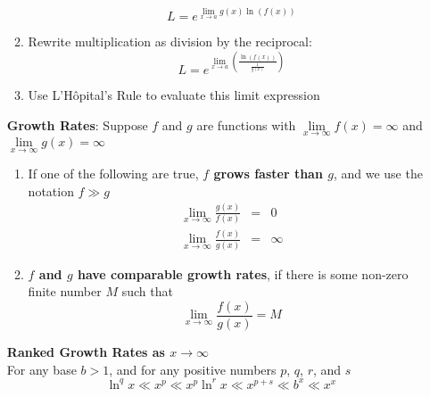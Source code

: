 \documentclass{article}
\begin{document}
\begin{itemize}
\begin{enumerate}
        $$L = e^{\lim\limits_{x \to a}{g(x)\ln{\left(f(x)\right)}}}$$
        \item Rewrite multiplication as division by the reciprocal:
        $$L = e^{\lim\limits_{x \to a}{\left(\frac{\ln{\left(f(x)\right)}}{\frac{1}{g(x)}}\right)}}$$
        \item Use L'Hôpital's Rule to evaluate this limit expression
    \end{enumerate}
    \textbf{Growth Rates}: Suppose $f$ and $g$ are functions with $\lim\limits_{x \to \infty}{f(x)} = \infty$ and $\lim\limits_{x \to \infty}{g(x)} = \infty$ \\
    \begin{enumerate}
        \item If one of the following are true, \textbf{$f$ grows faster than $g$}, and we use the notation $f \gg g$
        \begin{eqnarray}
            \lim_{x \to \infty}{\frac{g(x)}{f(x)}} &=& 0 \\
            \lim_{x \to \infty}{\frac{f(x)}{g(x)}} &=& \infty
        \end{eqnarray}
        \item \textbf{$f$ and $g$ have comparable growth rates}, if there is some non-zero finite number $M$ such that
        $$\lim_{x \to \infty}{\frac{f(x)}{g(x)}} = M$$
    \end{enumerate}
    \textbf{Ranked Growth Rates as $x \to \infty$} \\
    For any base $b > 1$, and for any positive numbers $p$, $q$, $r$, and $s$
    $$\ln^q{x} \ll x^p \ll x^p \ln^r{x} \ll x^{p + s} \ll b^x \ll x^x$$
\end{itemize}
\end{document}
